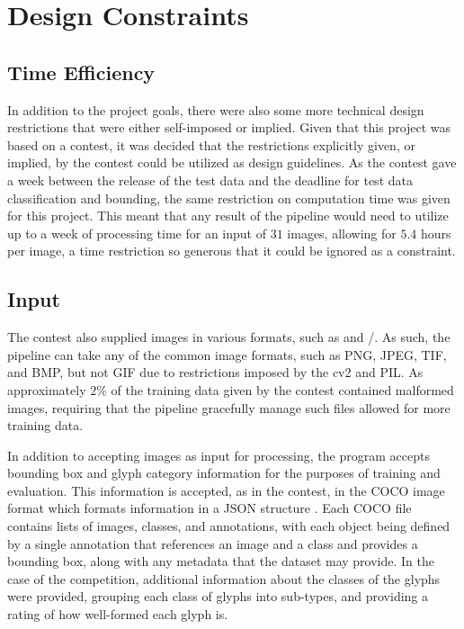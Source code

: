\section{Design Constraints}

\subsection{Time Efficiency}

In addition to the project goals, there were also some more technical design restrictions that were either self-imposed or implied. Given that this project was based on a contest, it was decided that the restrictions explicitly given, or implied, by the contest could be utilized as design guidelines. As the contest gave a week between the release of the test data and the deadline for test data classification and bounding, the same restriction on computation time was given for this project. This meant that any result of the pipeline would need to utilize up to a week of processing time for an input of $31$ images, allowing for $5.4$ hours per image, a time restriction so generous that it could be ignored as a constraint.

\subsection{Input}

The contest also supplied images in various formats, such as  and /. As such, the pipeline can take any of the common image formats, such as PNG, JPEG, TIF, and BMP, but not GIF due to restrictions imposed by the cv2 and PIL. As approximately $2\%$ of the training data given by the contest contained malformed images, requiring that the pipeline gracefully manage such files allowed for more training data.

In addition to accepting images as input for processing, the program accepts bounding box and glyph category information for the purposes of training and evaluation. This information is accepted, as in the contest, in the COCO image format which formats information in a JSON structure . Each COCO file contains lists of images, classes, and annotations, with each object being defined by a single annotation that references an image and a class and provides a bounding box, along with any metadata that the dataset may provide. In the case of the competition, additional information about the classes of the glyphs were provided, grouping each class of glyphs into sub-types, and providing a rating of how well-formed each glyph is.

